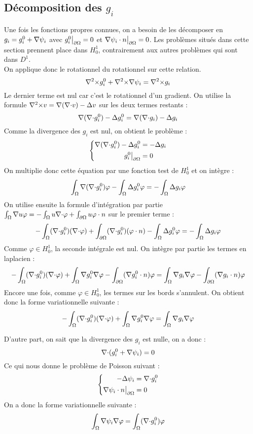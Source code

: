 \subsection{Décomposition des $g_i$}
\label{decomp}

Une fois les fonctions propres connues, on a besoin de les décomposer en $g_i=g_i^0+{\nabla}\psi_i$ avec $g_i^0{\big\rvert_{\partial\Omega}} = 0$ et ${\nabla}\psi_i\cdot n{\big\rvert_{\partial\Omega}} = 0$. Les problèmes situés dans cette section prennent place dans $H^1_0$, contrairement aux autres problèmes qui sont dans $D^1$.\\
On applique donc le rotationnel du rotationnel sur cette relation.\\
\[
{\nabla^2\times} g_i^0 +{\nabla^2\times}{\nabla}\psi_i = {\nabla^2\times} g_i
\]
Le dernier terme est nul car c'est le rotationnel d'un gradient. On utilise la formule ${\nabla^2\times} v={\nabla}({\nabla\cdot} v)-{\Delta} v$ sur les deux termes restants :
\[
{\nabla}({\nabla\cdot} g_i^0)-{\Delta} g_i^0 = {\nabla}({\nabla\cdot} g_i)-{\Delta} g_i
\]
Comme la divergence des $g_i$ est nul, on obtient le problème :
\[
\left\{
\begin{aligned}
{\nabla}({\nabla\cdot} g_i^0)-{\Delta} g_i^0 &= -{\Delta} g_i\\
g_i^0{\big\rvert_{\partial\Omega}} &= 0
\end{aligned}
\right.
\]
On multiplie donc cette équation par une fonction test de $H^1_0$ et on intègre :
\[
\int_\Omega {\nabla}({\nabla\cdot} g_i^0)\varphi - \int_\Omega {\Delta} g_i^0\varphi = -\int_\Omega {\Delta} g_i\varphi
\]
On utilise ensuite la formule d'intégration par partie $\int_\Omega {\nabla} u\varphi = -\int_\Omega u{\nabla\cdot}\varphi + \int_{\partial\Omega} u\varphi\cdot n$ sur le premier terme : 
\[
-\int_\Omega ({\nabla\cdot} g_i^0)({\nabla\cdot}\varphi) + \int_{\partial\Omega} ({\nabla\cdot} g_i^0)(\varphi\cdot n) - \int_\Omega {\Delta} g_i^0\varphi = -\int_\Omega {\Delta} g_i\varphi
\]
Comme $\varphi\in H^1_0$, la seconde intégrale est nul. On intègre par partie les termes en laplacien :
\[
-\int_\Omega ({\nabla\cdot} g_i^0)({\nabla\cdot}\varphi) + \int_\Omega {\nabla} g_i^0{\nabla}\varphi - \int_{\partial\Omega} ({\nabla} g_i^0\cdot n)\varphi = \int_\Omega {\nabla} g_i{\nabla}\varphi - \int_{\partial\Omega} ({\nabla} g_i\cdot n)\varphi
\]
Encore une fois, comme $\varphi\in H^1_0$, les termes sur les bords s'annulent. On obtient donc la forme variationnelle suivante :
\begin{eqnarray}
\label{fvgi0}
-\int_\Omega ({\nabla\cdot} g_i^0)({\nabla\cdot}\varphi) + \int_\Omega {\nabla} g_i^0{\nabla}\varphi = \int_\Omega {\nabla} g_i{\nabla}\varphi
\end{eqnarray}

D'autre part, on sait que la divergence des $g_i$ est nulle, on a donc :
\[
{\nabla\cdot} (g_i^0+{\nabla}\psi_i)=0
\]
Ce qui nous donne le problème de Poisson suivant :
\[
\left\{
\begin{aligned}
-{\Delta}\psi_i &= {\nabla\cdot} g_i^0\\
{\nabla}\psi_i\cdot n{\big\rvert_{\partial\Omega}} &= 0
\end{aligned}
\right.
\]
On a donc la forme variationnelle suivante :
\begin{eqnarray}
\label{fvpsii}
\int_\Omega {\nabla}\psi_i{\nabla}\varphi = \int_\Omega ({\nabla\cdot} g_i^0)\varphi
\end{eqnarray}

